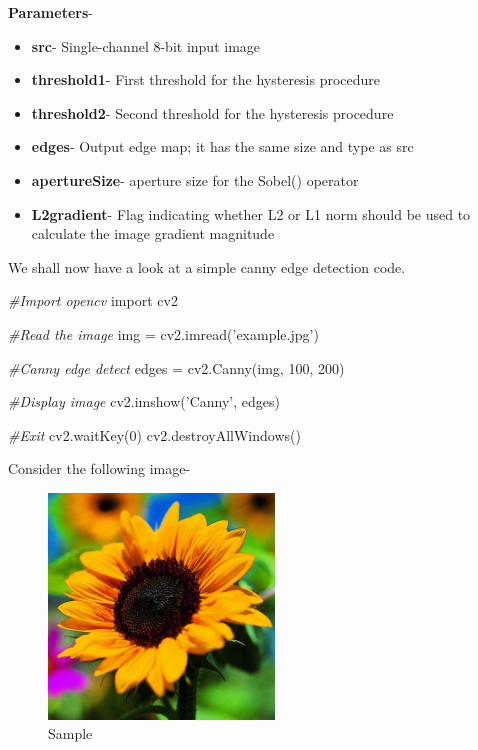 \documentclass[]{article}
\newenvironment{Shaded}{}{}
\newcommand{\DecValTok}[1]{\textcolor[rgb]{0.25,0.63,0.44}{{#1}}}
\newcommand{\StringTok}[1]{\textcolor[rgb]{0.25,0.44,0.63}{{#1}}}
\newcommand{\ImportTok}[1]{{#1}}
\newcommand{\CommentTok}[1]{\textcolor[rgb]{0.38,0.63,0.69}{\textit{{#1}}}}
\newcommand{\OperatorTok}[1]{\textcolor[rgb]{0.40,0.40,0.40}{{#1}}}
\newcommand{\NormalTok}[1]{{#1}}
\providecommand{\tightlist}{%
  \setlength{\itemsep}{0pt}\setlength{\parskip}{0pt}}
\begin{document}
\textbf{Parameters}-

\begin{itemize}
\tightlist
\item
  \textbf{src}- Single-channel 8-bit input image
\item
  \textbf{threshold1}- First threshold for the hysteresis procedure
\item
  \textbf{threshold2}- Second threshold for the hysteresis procedure
\item
  \textbf{edges}- Output edge map; it has the same size and type as src
\item
  \textbf{apertureSize}- aperture size for the Sobel() operator
\item
  \textbf{L2gradient}- Flag indicating whether L2 or L1 norm should be
  used to calculate the image gradient magnitude
\end{itemize}

We shall now have a look at a simple canny edge detection code.

\begin{Shaded}
\begin{Highlighting}[]
\CommentTok{#Import opencv}
\ImportTok{import} \NormalTok{cv2}

\CommentTok{#Read the image}
\NormalTok{img }\OperatorTok{=} \NormalTok{cv2.imread(}\StringTok{'example.jpg'}\NormalTok{)}

\CommentTok{#Canny edge detect}
\NormalTok{edges }\OperatorTok{=} \NormalTok{cv2.Canny(img, }\DecValTok{100}\NormalTok{, }\DecValTok{200}\NormalTok{)}

\CommentTok{#Display image}
\NormalTok{cv2.imshow(}\StringTok{'Canny'}\NormalTok{, edges)}

\CommentTok{#Exit}
\NormalTok{cv2.waitKey(}\DecValTok{0}\NormalTok{)}
\NormalTok{cv2.destroyAllWindows()}
\end{Highlighting}
\end{Shaded}

Consider the following image-

\begin{figure}[htbp]
\centering
\includegraphics[width=6cm]{images/Line_Detection/Canny_Images/sunflower.jpg}
\caption{Sample}
\end{figure}
\end{document}
